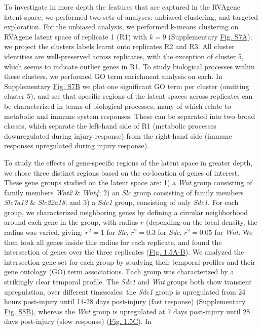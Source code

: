 {
  To investigate in more depth the features that are captured in the RVAgene latent space, we performed two sets of analyses: unbiased clustering, and targeted exploration. For the unbiased analysis, we performed k-means clustering on RVAgene latent space of replicate 1 (R1) with $k=9$ (Supplementary \hyperref[supp]{Fig. S7A}); we project the clusters labels learnt onto replicates R2 and R3. All cluster identities are well-preserved across replicates, with the exception of cluster 5, which seems to indicate outlier genes in R1. To study biological processes within these clusters, we performed GO term enrichment analysis on each. In Supplementary  \hyperref[supp]{Fig. S7B} we plot one significant GO term per cluster (omitting cluster 5), and see that specific regions of the latent spaces across replicates can be characterized in terms of biological processes, many of which relate to metabolic and immune system responses. These can be separated into two broad classes, which separate the left-hand side of R1 (metabolic processes downregulated during injury response) from the right-hand side (immune responses upregulated during injury response). 
}
\par 
To study the effects of gene-specific regions of the latent space in greater depth, we chose three
distinct regions based on the co-location of genes of interest. These gene groups studied on the
latent space are: 1) a {\em Wnt} group consisting of family members {\em Wnt2} \& {\em Wnt4}; 2) an
{\em Slc} group consisting of family members {\em Slc7a13} \& {\em Slc22a18}; and 3) a {\em Sdc1}
group, consisting of only {\em Sdc1}. For each group, we characterized neighboring genes by defining
a circular neighborhood around each gene in the group, with radius $r$ (depending on the local
density, the radius was varied, giving: $r^2 = 1$ for {\em Slc}, $r^2 = 0.3$ for {\em Sdc}, $r^2 =
0.05$ for {\em Wnt}. We then took all genes inside this radius for each replicate, and found the
intersection of genes over the three replicates (\hyperref[fig:fig6b]{Fig. 1.5A-B}). We analyzed the
intersection gene set for each group by studying their temporal profiles and their gene ontology
(GO) term associations. Each group was characterized by a strikingly clear temporal profile. The
{\em Sdc1} and {\em Wnt} groups both show transient upregulation, over different timescales: the
{\em Sdc1} group is upregulated from 24 hours post-injury until 14-28 days post-injury (fast
response) (Supplementary \hyperref[supp]{Fig. S8B}), whereas the {\em Wnt} group is upregulated at 7
days post-injury until 28 days post-injury (slow response) (\hyperref[fig:fig6b]{Fig. 1.5C}). In
